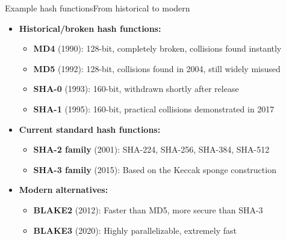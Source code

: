 \documentclass[aspectratio=169, lualatex, handout]{beamer}
\begin{document}
\begin{frame}{Example hash functions}{From historical to modern}
	\begin{itemize}
		\item \textbf{Historical/broken hash functions:}
		      \begin{itemize}
			      \item \textbf{MD4} (1990): 128-bit, completely broken, collisions found instantly
			      \item \textbf{MD5} (1992): 128-bit, collisions found in 2004, still widely misused
			      \item \textbf{SHA-0} (1993): 160-bit, withdrawn shortly after release
			      \item \textbf{SHA-1} (1995): 160-bit, practical collisions demonstrated in 2017
		      \end{itemize}
		\item \textbf{Current standard hash functions:}
		      \begin{itemize}
			      \item \textbf{SHA-2 family} (2001): SHA-224, SHA-256, SHA-384, SHA-512
			      \item \textbf{SHA-3 family} (2015): Based on the Keccak sponge construction
		      \end{itemize}
		\item \textbf{Modern alternatives:}
		      \begin{itemize}
			      \item \textbf{BLAKE2} (2012): Faster than MD5, more secure than SHA-3
			      \item \textbf{BLAKE3} (2020): Highly parallelizable, extremely fast
		      \end{itemize}
	\end{itemize}
\end{frame}
\end{document}
